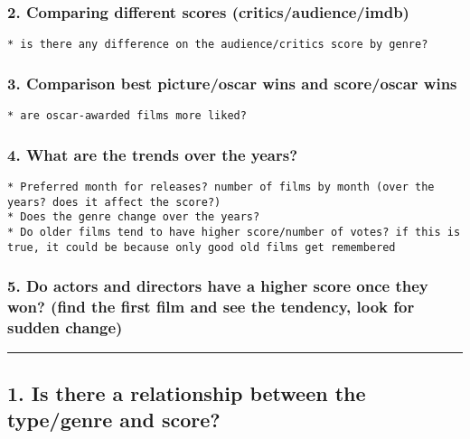 \documentclass[]{article}
\begin{document}
\subsubsection{2. Comparing different scores
(critics/audience/imdb)}\label{comparing-different-scores-criticsaudienceimdb}

\begin{verbatim}
* is there any difference on the audience/critics score by genre?
\end{verbatim}

\subsubsection{3. Comparison best picture/oscar wins and score/oscar
wins}\label{comparison-best-pictureoscar-wins-and-scoreoscar-wins}

\begin{verbatim}
* are oscar-awarded films more liked?
\end{verbatim}

\subsubsection{4. What are the trends over the
years?}\label{what-are-the-trends-over-the-years}

\begin{verbatim}
* Preferred month for releases? number of films by month (over the years? does it affect the score?)
* Does the genre change over the years?
* Do older films tend to have higher score/number of votes? if this is true, it could be because only good old films get remembered
\end{verbatim}

\subsubsection{5. Do actors and directors have a higher score once they
won? (find the first film and see the tendency, look for sudden
change)}\label{do-actors-and-directors-have-a-higher-score-once-they-won-find-the-first-film-and-see-the-tendency-look-for-sudden-change}

\begin{center}\rule{0.5\linewidth}{\linethickness}\end{center}

\subsection{1. Is there a relationship between the type/genre and
score?}\label{is-there-a-relationship-between-the-typegenre-and-score-1}
\end{document}
